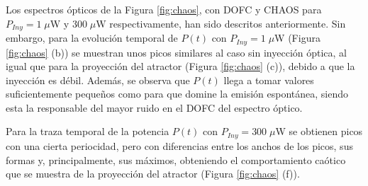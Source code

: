 Los espectros \'opticos de la Figura \ref{fig:chaos}, con DOFC y CHAOS para $P_{Iny} = 1\;\mu$W y $300\;\mu$W respectivamente, han sido descritos anteriormente. Sin embargo, para la evoluci\'on temporal de $P(t)$ con $P_{Iny} = 1\;\mu$W (Figura \ref{fig:chaos} (b)) se muestran unos picos similares al caso sin inyecci\'on \'optica, al igual que para la proyecci\'on del atractor (Figura \ref{fig:chaos} (c)), debido a que la inyecci\'on es d\'ebil. Adem\'as, se observa que $P(t)$ llega a tomar valores suficientemente pequeños como para que domine la emisión espont\'anea, siendo esta la responsable del mayor ruido en el DOFC del espectro \'optico.

Para la traza temporal de la potencia $P(t)$ con $P_{Iny} = 300\;\mu$W se obtienen picos con una cierta periocidad, pero con diferencias entre los anchos de los picos, sus formas y, principalmente, sus m\'aximos, obteniendo el comportamiento ca\'otico que se muestra de la proyecci\'on del atractor (Figura \ref{fig:chaos} (f)).
